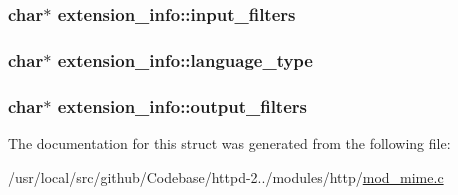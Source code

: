 \subsubsection[{\texorpdfstring{input\+\_\+filters}{input_filters}}]{\setlength{\rightskip}{0pt plus 5cm}char$\ast$ extension\+\_\+info\+::input\+\_\+filters}\hypertarget{structextension__info_a0aeaf3b4d1169fd14217669d33635cc8}{}\label{structextension__info_a0aeaf3b4d1169fd14217669d33635cc8}
\subsubsection[{\texorpdfstring{language\+\_\+type}{language_type}}]{\setlength{\rightskip}{0pt plus 5cm}char$\ast$ extension\+\_\+info\+::language\+\_\+type}\hypertarget{structextension__info_a697c3df1f8e026ca53b1b6d527ceb578}{}\label{structextension__info_a697c3df1f8e026ca53b1b6d527ceb578}
\subsubsection[{\texorpdfstring{output\+\_\+filters}{output_filters}}]{\setlength{\rightskip}{0pt plus 5cm}char$\ast$ extension\+\_\+info\+::output\+\_\+filters}\hypertarget{structextension__info_a6339e20781569df817ade3c4e17c68f0}{}\label{structextension__info_a6339e20781569df817ade3c4e17c68f0}


The documentation for this struct was generated from the following file\+:\begin{DoxyCompactItemize}
\item 
/usr/local/src/github/\+Codebase/httpd-\/2../modules/http/\hyperlink{mod__mime_8c}{mod\+\_\+mime.\+c}\end{DoxyCompactItemize}

